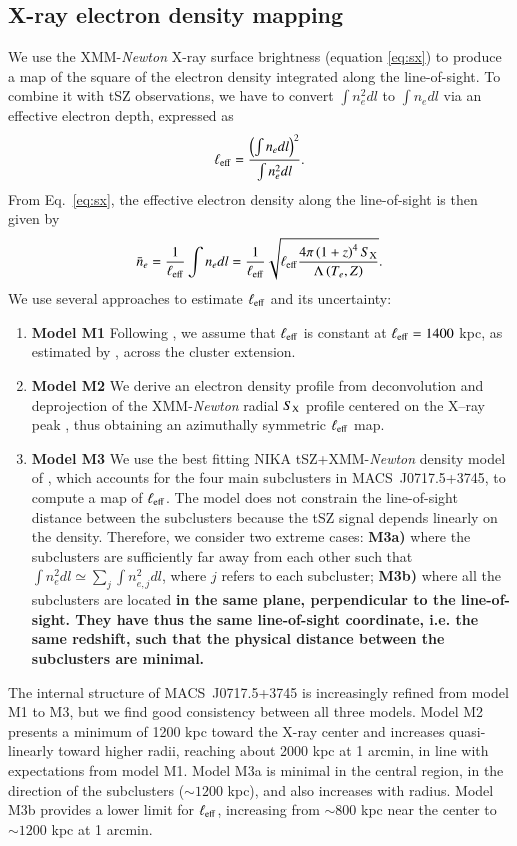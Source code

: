 \documentclass[twocolumn,traditabstract]{aa}
\begin{document}
\subsection{X-ray electron density mapping}
We use the XMM-\textit{Newton} X-ray surface brightness (equation \ref{eq:sx}) to produce a map of the square of the electron density integrated along the line-of-sight. To combine it with tSZ observations, we have to convert $\int n_e^2 dl$ to $\int n_e dl$ via an effective electron depth, expressed as
\begin{equation}
	\ell_{\rm eff} = \frac{\left(\int n_e dl\right)^2}{\int n_e^2 dl}.
\label{eq:l_eff}
\end{equation}
From Eq.~\ref{eq:sx}, the effective electron density along the line-of-sight is then given by
\begin{equation}
	\bar{n}_e = \frac{1}{\ell_{\rm eff}} \int n_e dl = \frac{1}{\ell_{\rm eff}}\sqrt{\ell_{\rm eff} \frac{4 \pi \left(1+z\right)^4 S_{\rm X}}{\Lambda\left(T_e, Z\right)}}.
\label{eq:pseudo_ne}
\end{equation}
We use several approaches to estimate $\ell_{\rm eff}$ and its uncertainty:
\begin{enumerate}
\item {\bf Model M1} Following \cite{Sayers2013}, we assume that $\ell_{\rm eff}$ is constant at $\ell_{\rm eff}=1400$ kpc, as estimated by \citet{Mroczkowski2012}, across the cluster extension. 
\item {\bf Model M2} We derive an electron density profile from deconvolution and deprojection of the XMM-\textit{Newton} radial $S_{\rm X}$ profile centered on the X--ray peak \citep{Croston2006}, thus obtaining an azimuthally symmetric $\ell_{\rm eff}$ map. 
\item {\bf Model M3} We use the best fitting NIKA tSZ+XMM-\textit{Newton} density model of \cite{Adam2016b}, which accounts for the four main subclusters in \mbox{MACS~J0717.5+3745}, to compute a map of $\ell_{\rm eff}$. The model does not constrain the line-of-sight distance between the subclusters because the tSZ signal depends linearly on the density. Therefore, we consider two extreme cases: {\bf M3a)} where the subclusters are sufficiently far away from each other such that $\int n_e^2 dl \simeq \sum_j \int n_{e,j}^2 dl$, where $j$ refers to each subcluster; {\bf M3b)} where all the subclusters are located {\bf in the same plane, perpendicular to the line-of-sight. They have thus the same line-of-sight coordinate, i.e. the same redshift, such that the physical distance between the subclusters are minimal.}
\end{enumerate}
The internal structure of \mbox{MACS~J0717.5+3745} is increasingly refined from model M1 to M3, but we find good consistency between all three models. Model M2 presents a minimum of 1200 kpc toward the X-ray center and increases quasi-linearly toward higher radii, reaching about 2000 kpc at 1 arcmin, in line with expectations from model M1. Model M3a is minimal in the central region, in the direction of the subclusters ($\sim 1200$ kpc), and also increases with radius. Model M3b provides a lower limit for $\ell_{\rm eff}$, increasing from $\sim 800$ kpc near the center to $\sim 1200$ kpc at 1 arcmin. 
\end{document}
